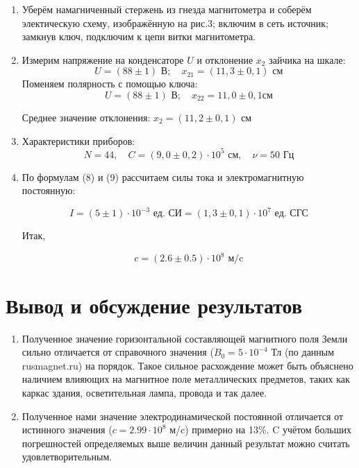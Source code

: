\documentclass[a4paper,12pt]{article} %
\begin{document}
\begin{enumerate}
  \begin{enumerate}
  \item Уберём намагниченный стержень из гнезда магнитометра и соберём электическую схему, изображённую на рис.3; включим в сеть источник; замкнув ключ, подключим к цепи витки магнитометра.
  \item Измерим напряжение на конденсаторе $U$ и отклонение $x_{2}$ зайчика на шкале:
    \begin{equation*}
      U = (88\pm 1)\text{ В};\quad x_{21} = (11,3\pm0,1)\text{ см}
    \end{equation*}
    Поменяем полярность с помощью ключа:
    \begin{equation*}
      U = (88\pm1)\text{ В};\quad x_{22} = 11,0\pm0,1\text{см}
    \end{equation*}
    
    Среднее значение отклонения: $x_{2} = (11,2\pm0,1) \text{ см} $ 

  \item Характеристики приборов:
    $$N = 44,\quad C = (9,0\pm0,2)\cdot10^{5}\text{ см},\quad \nu = 50\text{ Гц} $$

  \item  По формулам (8) и (9) рассчитаем силы тока и электромагнитную постоянную:

    $$I = (5\pm1)\cdot10^{-3}\text{ ед. СИ} = (1,3\pm0,1)\cdot10^{7}\text{ ед. СГС}$$

    Итак,

    $$c = (2.6\pm0.5)\cdot10^{8} \text{ м/c}$$

    
  \end{enumerate}

  
\end{enumerate}






\section{Вывод и обсуждение результатов}

\begin{enumerate}
\item Полученное значение горизонтальной составляющей магнитного поля Земли сильно отличается от справочного значения ($B_{0} = 5\cdot10^{-4}$ Тл (по данным rusmagnet.ru) на порядок. Такое сильное расхождение может быть объяснено наличием влияющих на магнитное поле металлических предметов, таких как каркас здания, осветительная лампа, провода и так далее.
\item Полученное нами значение электродинамической постоянной отличается от истинного значения ($c = 2.99\cdot10^{8} $ м/c) примерно на 13\%. C учётом больших погрешностей определяемых выше величин данный результат можно считать удовлетворительным.
\end{enumerate}
\end{document}
